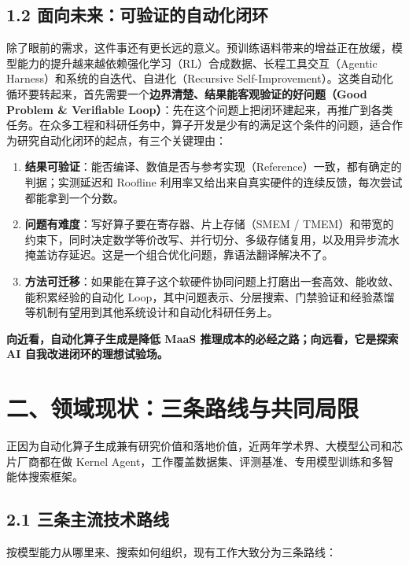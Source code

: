 \subsection{1.2 面向未来：可验证的自动化闭环}
除了眼前的需求，这件事还有更长远的意义。预训练语料带来的增益正在放缓，模型能力的提升越来越依赖强化学习（RL）合成数据、长程工具交互（Agentic Harness）和系统的自迭代、自进化（Recursive Self-Improvement）。这类自动化循环要转起来，首先需要一个\textbf{边界清楚、结果能客观验证的好问题（Good Problem \& Verifiable Loop）}：先在这个问题上把闭环建起来，再推广到各类任务。在众多工程和科研任务中，算子开发是少有的满足这个条件的问题，适合作为研究自动化闭环的起点，有三个关键理由：


\begin{enumerate}[start=1]
\item
\textbf{结果可验证}：能否编译、数值是否与参考实现（Reference）一致，都有确定的判据；实测延迟和 Roofline 利用率又给出来自真实硬件的连续反馈，每次尝试都能拿到一个分数。


\item
\textbf{问题有难度}：写好算子要在寄存器、片上存储（SMEM / TMEM）和带宽的约束下，同时决定数学等价改写、并行切分、多级存储复用，以及用异步流水掩盖访存延迟。这是一个组合优化问题，靠语法翻译解决不了。


\item
\textbf{方法可迁移}：如果能在算子这个软硬件协同问题上打磨出一套高效、能收敛、能积累经验的自动化 Loop，其中问题表示、分层搜索、门禁验证和经验蒸馏等机制有望用到其他系统设计和自动化科研任务上。


\end{enumerate}


\textbf{向近看，自动化算子生成是降低 MaaS 推理成本的必经之路；向远看，它是探索 AI 自我改进闭环的理想试验场。}


\SourceSeparator
\clearpage
\section{二、领域现状：三条路线与共同局限}
正因为自动化算子生成兼有研究价值和落地价值，近两年学术界、大模型公司和芯片厂商都在做 Kernel Agent，工作覆盖数据集、评测基准、专用模型训练和多智能体搜索框架。


\subsection{2.1 三条主流技术路线}
按模型能力从哪里来、搜索如何组织，现有工作大致分为三条路线：


